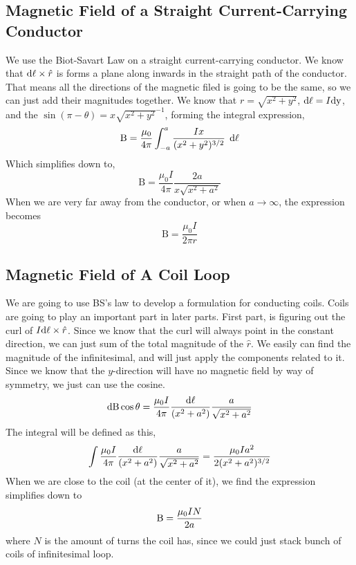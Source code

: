 \subsection{Magnetic Field of a Straight Current-Carrying Conductor}
We use the Biot-Savart Law on a straight current-carrying conductor. 
We know that $\mathrm{\mathrm{d}\ell} \times \hat{r}$ is forms a plane along inwards in the straight path of the conductor. That means all the directions of the magnetic filed is going to be the same, so we can just add their magnitudes together. We know that $r=\sqrt{x^2 + y^2}$, $\mathrm{\mathrm{d}\ell} = I\mathrm{dy}$, and the $\sin(\pi-\theta) = x\sqrt{x^2+y^2}^{-1}$, forming the integral expression, 
\begin{equation*}
	\mathrm{B}=\frac{\mu_0}{4\pi} \int_{-a}^{a} \frac{Ix}{(x^2+y^2)^{3/2}} \:\: \mathrm{d\ell} 
\end{equation*} 
Which simplifies down to, 
\begin{equation*}
	\mathrm{B}= \frac{\mu_0I}{4\pi} \frac{2a}{x\sqrt{x^2 + a^2 }}
\end{equation*}
When we are very far away from the conductor, or when $a \to \infty$, the expression becomes 
\begin{equation*}
	\mathrm{B}= \frac{\mu_0I}{2\pi r}
\end{equation*}


\pagebreak
\subsection{Magnetic Field of A Coil Loop}
We are going to use BS's law to develop a formulation for conducting coils. Coils are going to play an important part in later parts. First part, is figuring out the curl of $I\mathrm{d\ell} \times \hat{r}$. Since we know that the curl will always point in the constant direction, we can just sum of the total magnitude of the $\hat{r}$.
We easily can find the magnitude of the infinitesimal, and will just apply the components related to it. Since we know that the $y$-direction will have no magnetic field by way of symmetry, we just can use the cosine.
\begin{equation*}
	\mathrm{dB}\cos\theta = \frac{\mu_0I}{4\pi}\frac{\mathrm{d\ell}}{(x^2+a^2)} \frac{a}{\sqrt{x^2+a^2}}
\end{equation*}
The integral will be defined as this, 
\begin{equation*}
	\int \frac{\mu_0I}{4\pi}\frac{\mathrm{d\ell}}{(x^2+a^2)} \frac{a}{\sqrt{x^2+a^2}} = \frac{\mu_0Ia^2}{2(x^2+a^2)^{3/2}}
\end{equation*}
When we are close to the coil (at the center of it), we find the expression simplifies down to 
\begin{equation*}
	\mathrm{B} = \frac{\mu_0IN}{2a}
\end{equation*}
where $N$ is the amount of turns the coil has, since we could just stack bunch of coils of infinitesimal loop.


